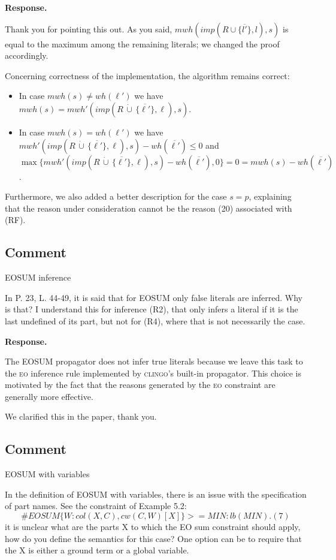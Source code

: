 \documentclass[11pt]{article}
\newcommand{\mwh}{\mathit{mwh}}
\newcommand{\wh}{\mathit{wh}}
\newcommand{\cupdot}{\,\dot{\cup}\,}
\theoremstyle{definition}
\newcommand{\revieweranswered}{\subsection{Comment}}
\newenvironment{response}{
    \color{blue} \textbf{Response.}
}{
}
\begin{document}
\begin{response}
Thank you for pointing this out.
As you said, $\mwh(\mathit{imp}(R \cup  \{\overline{l'}\},l),s)$ is equal to the maximum among the remaining literals; we changed the proof accordingly.

Concerning correctness of the implementation, the algorithm remains correct:
\begin{itemize}
    \item In case $\mwh(s) \neq \wh(\ell')$ we have $\mwh(s) = \mwh'(\mathit{imp}(R \cupdot \{ {\overline{\ell'}} \},\ell), s)$.
    \item In case $\mwh(s)  = \wh(\ell')$ we have $\mwh'(\mathit{imp}(R \cupdot \{ {\overline{\ell'}} \},\ell), s) - \mathit{wh}(\overline{\ell'}) \le 0$ and \\$\max\{\mwh'(\mathit{imp}(R \cupdot \{ {\overline{\ell'}} \},\ell), s) - \mathit{wh}(\overline{\ell'}),0\} = 0 = \mwh(s) - \mathit{wh}(\overline{\ell'})$.
\end{itemize}

Furthermore, we also added a better description for the case $s=p$, explaining that the reason under consideration cannot be the reason (20) associated with (RF).
\end{response}


\vspace{0.5cm}
\revieweranswered EOSUM inference

In P. 23, L. 44-49, it is said that for EOSUM only false literals are inferred.
Why is that?
I understand this for inference (R2),
that only infers a literal if it is the last undefined of its part,
but not for (R4), where that is not necessarily the case.

\begin{response}
The EOSUM propagator does not infer true literals because we leave this task to the \textsc{eo} inference rule implemented by \textsc{clingo}'s built-in propagator. This choice is motivated by the fact that the reasons generated by the \textsc{eo} constraint are generally more effective.

We clarified this in the paper, thank you.
\end{response}

\vspace{0.5cm}
\revieweranswered EOSUM with variables

In the definition of EOSUM with variables,
there is an issue with the specification of part names.
See the constraint of Example 5.2:
$$\#\mathit{EOSUM} \{ W : col(X,C), cw(C,W) [X] \} >= MIN : lb(MIN). (7)$$
it is unclear what are the parts X to which the EO sum constraint should apply,
how do you define the semantics for this case?
One option can be to require that the X is either a ground term or a global variable.
\end{document}

